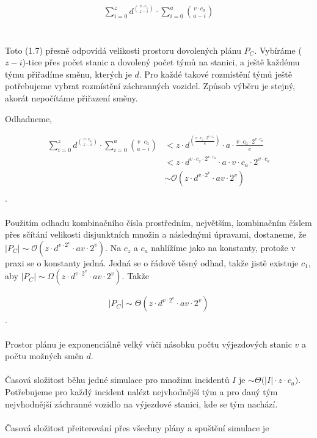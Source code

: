 \begin{align}
  \sum_{i=0}^{z}{d^{v \cdot c_z \choose z - i}} \cdot \sum_{i = 0}^{a}{v \cdot c_a \choose a - i}
\end{align}
\\
\\
Toto (1.7) %
přesně odpovídá velikosti prostoru dovolených plánu $P_C$. Vybíráme ($z-i$)-tice přes počet stanic a dovolený počet týmů na stanici, a ještě každému týmu
přiřadíme směnu, kterých je $d$. Pro každé takové rozmístění týmů ještě potřebujeme vybrat rozmístění záchranných vozidel.
Způsob výběru je stejný, akorát nepočítáme přiřazení směny.

\clearpage

Odhadneme,

\begin{align*}
  \sum_{i=0}^{z}{d^{v \cdot c_z \choose z - i}} \cdot \sum_{i = 0}^{a}{v \cdot c_a \choose a - i}
  &< z \cdot d^{\left( \frac{v \cdot c_z \cdot 2^{v \cdot c_z}}{e} \right)} \cdot a \cdot {\frac{v \cdot c_a \cdot 2^{v \cdot c_a}}{e}}\\
  &< z \cdot d^{v \cdot c_z \cdot 2^{v \cdot c_z}} \cdot a \cdot {v \cdot c_a \cdot 2^{v \cdot c_a}}\\
  &\sim \mathcal{O}(z \cdot d^{v \cdot 2^v} \cdot av \cdot 2^v)\\
\end{align*}
.
\\
\\
Použitím odhadu kombinačního čísla prostředním, největším, kombinačním číslem přes sčítání velikosti disjunktních množin a následnými úpravami,
dostaneme, že $|P_C| \sim \mathcal{O}(z \cdot d^{v \cdot 2^v} \cdot av \cdot 2^v)$.
Na $c_z$ a $c_a$ nahlížíme jako na konstanty, protože v praxi se o konstanty jedná. Jedná se o řádově těsný odhad, takže jistě existuje $c_1$, aby $|P_C| \sim \Omega(z \cdot d^{v \cdot 2^v} \cdot av \cdot 2^v)$.
Takže 

\begin{align*}
  |P_C| \sim \Theta{(z \cdot d^{v \cdot 2^v} \cdot av \cdot 2^v)}
\end{align*}
.
\\
\\
Prostor plánu je exponenciálně velký vůči násobku počtu výjezdových stanic $v$ a počtu možných směn $d$.
\\
\\
Časová složitost běhu jedné simulace pro množinu incidentů $I$ je $\sim \Theta{(|I| \cdot z \cdot c_a})$.
Potřebujeme pro každý incident nalézt nejvhodnější tým a pro daný tým nejvhodnější záchranné vozidlo na výjezdové stanici, kde se tým nachází.
\\
\\
Časová složitost přeiterování přes všechny plány a spuštění simulace je

